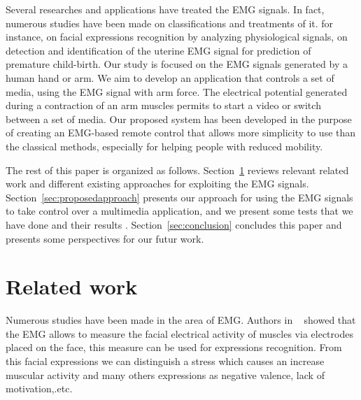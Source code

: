 \documentclass[conference]{IEEEtran}
\begin{document}
\par
Several researches and applications have treated the EMG signals. In fact, numerous studies have been made on classifications and treatments of it. for instance, on facial expressions recognition by analyzing physiological signals, on detection and identification of the uterine EMG signal for prediction of premature child-birth.
Our study is focused on the EMG signals generated by a human hand or arm.  We aim to develop an application that controls a set of media, using the EMG signal with arm force. The electrical potential generated during a contraction of an arm muscles permits to start a video or switch between a set of media. Our proposed system has been developed in the purpose of creating an EMG-based remote control that allows more simplicity to use than the classical methods, especially for helping people with reduced mobility.


The rest of this paper is organized as follows.
Section~\ref{sec:related} reviews relevant related work and different existing approaches for exploiting the EMG signals. Section~\ref{sec:proposedapproach} presents our approach for using the EMG signals to take control over a multimedia application, and we present some tests that we have done and their results . Section~\ref{sec:conclusion} concludes this paper and presents some perspectives for our futur work.\par
\section{Related work} \label{sec:related}


Numerous studies have been made in the area of EMG. Authors in ~\cite{Hamdi} showed that the EMG allows to measure the facial electrical activity of muscles via electrodes placed on the face, this measure can be used for expressions recognition. From this facial expressions we can distinguish a stress which causes an increase muscular activity and many others expressions as negative valence, lack of motivation,.etc. \par
\end{document}
